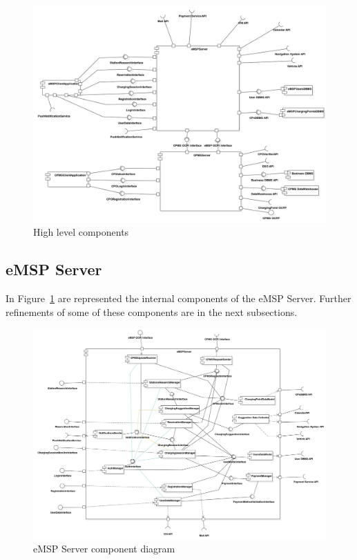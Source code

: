 \documentclass{Configuration_Files/PoliMi3i_thesis}
\begin{document}
\begin{figure}[H]
    \centering
    \includegraphics[width=1\textwidth]{Images/component/ComponentDiagram1.jpg}
    \caption{High level components}
    \label{fig:component-hl}
\end{figure}

\subsection{eMSP Server}

In Figure~\ref{fig:component-hl} are represented the internal components of the eMSP Server. Further refinements of some of these components are in the next subsections. 

\begin{figure}[H]
    \centering
    \includegraphics[width=1\textwidth]{Images/component/eMSPServer.jpg}
    \caption{eMSP Server component diagram}
    \label{fig:eMSPServer}
\end{figure}
\end{document}
